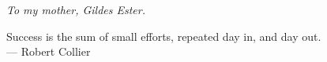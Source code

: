 \vspace*{2cm}

\large
\begin{flushleft}
    \noindent\textit{To my mother, Gildes Ester.}
\end{flushleft}

\vspace*{5cm}

\begin{flushright}
    \normalsize
    Success is the sum of small efforts, repeated day in, and day out. \\ --- Robert Collier
\end{flushright}
